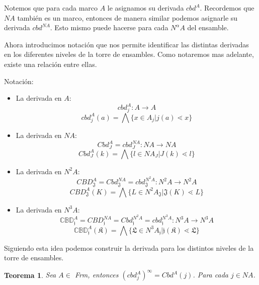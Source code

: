 \documentclass[12pt,letterpaper,titlepage]{article}
\newtheorem{thm}{Teorema}
\theoremstyle{definition}
\newcommand\<{\langle}
\renewcommand\>{\rangle}
\begin{document}
Notemos que para cada marco $A$ le asignamos su derivada $cbd^A$. Recordemos que $NA$ también es un marco, entonces de manera similar podemos asignarle su derivada $cbd^{NA}$. Esto mismo puede hacerse para cada $N^\alpha A$ del ensamble.

Ahora introducimos notación que nos permite identificar las distintas derivadas en los diferentes niveles de la torre de ensambles. Como notaremos mas adelante, existe una relación entre ellas.
\begin{description}
\item[Notación:]
\end{description}
\begin{itemize}
\item La derivada en $A$: $$cbd_j^A:A\to A$$
$$cbd_j^A(a)=\bigwedge\{x\in A_j|j(a)\lessdot x\}$$
\item La derivada en $NA$:  $$Cbd_J^A=cbd_J^{NA}:NA\to NA$$
$$Cbd_J^A(k)=\bigwedge\{l\in NA_J|J(k)\lessdot l\}$$
\item La derivada en $N^2A$: $$CBD_\mathfrak{J}^A=Cbd_\mathfrak{J}^{NA}=cbd_\mathfrak{J}^{N^2A}:N^2A\to N^2A$$
$$CBD_\mathfrak{J}^A(K)=\bigwedge\{L\in N^2A_\mathfrak{J}|\mathfrak{J}(K)\lessdot L\}$$
\item La derivada en $N^3A$: $$\mathbb{CBD}_\mathfrak{j}^A=CBD_\mathfrak{j}^{NA}=Cbd_\mathfrak{j}^{N^2A}=cbd_\mathfrak{j}^{N^3A}:N^3A\to N^3A$$
$$\mathbb{CBD}_\mathfrak{j}^A(\mathfrak{K})=\bigwedge\{\mathfrak{L}\in N^3A_\mathfrak{j}|\mathfrak{j}(\mathfrak{K})\lessdot \mathfrak{L}\}$$
\end{itemize}

Siguiendo esta idea podemos construir la derivada para los distintos niveles de la torre de ensambles.

\begin{thm}\label{Teo24}
Sea $A\in$ \textit{Frm}, entonces $(cbd_j^A)^\infty=Cbd^A(j)$. Para cada $j\in NA$.
\end{thm}
\end{document}
